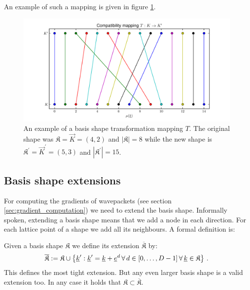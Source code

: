An example of such a mapping is given in figure \ref{fig:trafo_map}.

\begin{figure}
  \centering
  \includegraphics[scale=0.5]{./fig/trafo_map.pdf}
  \caption[Transformation mapping example]
          {An example of a basis shape transformation mapping $T$. The original
          shape was $\mathfrak{K} = \vec{K} = (4,2)$ and $|\mathfrak{K}| = 8$ while
          the new shape is $\mathfrak{K}^{\prime} = \vec{K}^{\prime} = (5,3)$ and
          $|\mathfrak{K}^{\prime}| = 15$.}
  \label{fig:trafo_map}
\end{figure}


\subsection{Basis shape extensions}


For computing the gradients of wavepackets (see section \ref{sec:gradient_computation})
we need to extend the basis shape. Informally spoken, extending a basis shape
means that we add a node in each direction. For each lattice point of a shape
we add all its neighbours. A formal definition is:

\begin{definition}
  Given a basis shape $\mathfrak{K}$ we define its extension $\overline{\mathfrak{K}}$ by:
  \begin{equation*}
    \overline{\mathfrak{K}} := \mathfrak{K}
                            \cup \left\{ \underline{k}^\prime : \underline{k}^\prime = \underline{k} + \underline{e}^d \,\forall\, d \in [0,\ldots,D-1]
                                                          \,\forall\, \underline{k} \in \mathfrak{K} \right\} \,.
  \end{equation*}
  This defines the most tight extension. But any even larger basis shape is a
  valid extension too. In any case it holds that $\mathfrak{K} \subset \overline{\mathfrak{K}}$.
\end{definition}

